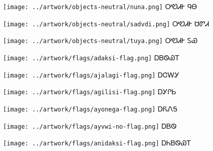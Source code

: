 \documentclass[avery5371]{flashcards}%
\begin{document}
\begin{flashcard}{
\texttt{[image: ../artwork/objects-neutral/nuna.png]}
}\Huge ᎤᏬᏗᎨ ᏄᎾ
\end{flashcard}

\begin{flashcard}{
\texttt{[image: ../artwork/objects-neutral/sadvdi.png]}
}\Huge ᎤᏬᏗᎨ ᏌᏛᏗ
\end{flashcard}

\begin{flashcard}{
\texttt{[image: ../artwork/objects-neutral/tuya.png]}
}\Huge ᎤᏬᏗᎨ ᏚᏯ
\end{flashcard}


\begin{flashcard}{
\texttt{[image: ../artwork/flags/adaksi-flag.png]}
}\Huge ᎠᏴᏫᏯᎢ
\end{flashcard}

\begin{flashcard}{
\texttt{[image: ../artwork/flags/ajalagi-flag.png]}
}\Huge ᎠᏣᎳᎩ
\end{flashcard}

\begin{flashcard}{
\texttt{[image: ../artwork/flags/agilisi-flag.png]}
}\Huge ᎠᎩᎵᏏ
\end{flashcard}

\begin{flashcard}{
\texttt{[image: ../artwork/flags/ayonega-flag.png]}
}\Huge ᎠᏲᏁᎦ
\end{flashcard}

\begin{flashcard}{
\texttt{[image: ../artwork/flags/ayvwi-no-flag.png]}
}\Huge ᎠᏴᏫ
\end{flashcard}


\begin{flashcard}{
\texttt{[image: ../artwork/flags/anidaksi-flag.png]}
}\Huge ᎠᏂᏴᏫᏯᎢ
\end{flashcard}
\end{document}
